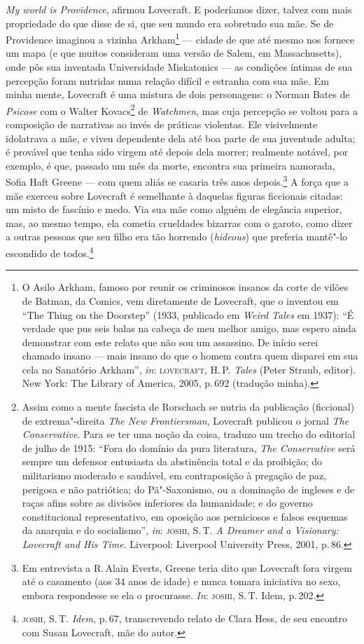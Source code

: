 \emph{My world is Providence}, afirmou Lovecraft. E poderíamos dizer,
talvez com mais propriedade do que disse de si, que seu mundo era
sobretudo sua mãe. Se de Providence imaginou a vizinha Arkham\footnote{O
  Asilo Arkham, famoso por reunir os criminosos insanos da corte de
  vilões de Batman, da  Comics, vem diretamente de Lovecraft, que o
  inventou em ``The Thing on the Doorstep'' (1933, publicado em
  \emph{Weird Tales} em 1937): ``É verdade que pus seis balas na cabeça
  de meu melhor amigo, mas espero ainda demonstrar com este relato que
  não sou um assassino. De início serei chamado insano --- mais insano
  do que o homem contra quem disparei em sua cela no Sanatório Arkham'',
  \emph{in}: \textsc{lovecraft}, H.\,P. \emph{Tales} (Peter Straub, editor). New
  York: The Library of America, 2005, p.\,692 (tradução minha).} ---
cidade de que até mesmo nos fornece um mapa (e que muitos consideram uma
versão de Salem, em Massachusetts), onde pôs sua inventada Universidade
Miskatonics --- as condições íntimas de sua percepção foram nutridas
numa relação difícil e estranha com sua mãe. Em minha mente, Lovecraft é
uma mistura de dois personagens: o Norman Bates de \emph{Psicose} com o
Walter Kovacs\footnote{Assim como a mente fascista de Rorschach se
  nutria da publicação (ficcional) de extrema"-direita \emph{The New
  Frontiersman}, Lovecraft publicou o jornal \emph{The Conservative}.
  Para se ter uma noção da coisa, traduzo um trecho do editorial de
  julho de 1915: ``Fora do domínio da pura literatura, \emph{The
  Conservative} será sempre um defensor entusiasta da abstinência total
  e da proibição; do militarismo moderado e saudável, em contraposição à
  pregação de paz, perigosa e não patriótica; do Pã"-Saxonismo, ou a
  dominação de ingleses e de raças afins sobre as divisões inferiores da
  humanidade; e do governo constitucional representativo, em oposição
  aos perniciosos e falsos esquemas da anarquia e do socialismo'',
  \emph{in}: \textsc{joshi}, S.\,T. \emph{A Dreamer and a Visionary: Lovecraft and
  His Time}. Liverpool: Liverpool University Press, 2001, p.\,86.} de
\emph{Watchmen}, mas cuja percepção se voltou para a composição de
narrativas ao invés de práticas violentas. Ele visivelmente idolatrava a
mãe, e viveu dependente dela até boa parte de sua juventude adulta; é
provável que tenha sido virgem até depois dela morrer; realmente
notável, por exemplo, é que, passado um mês da morte, encontra sua
primeira namorada, Sofia Haft Greene --- com quem aliás se casaria três
anos depois.\footnote{Em entrevista a R.\,Alain Everts, Greene teria dito
  que Lovecraft fora virgem até o casamento (aos 34 anos de idade) e
  nunca tomara iniciativa no sexo, embora respondesse se ela o
  procurasse. \emph{In}: \textsc{joshi}, S.\,T. Idem, p.\,202.} A força que a mãe
exerceu sobre Lovecraft é semelhante à daquelas figuras ficcionais
citadas: um misto de fascínio e medo. Via sua mãe como alguém de
elegância superior, mas, ao mesmo tempo, ela cometia crueldades bizarras
com o garoto, como dizer a outras pessoas que seu filho era tão horrendo
(\emph{hideous}) que preferia mantê"-lo escondido de todos.\footnote{\textsc{joshi}, S.\,T. \emph{Idem}, p.\,67, transcrevendo relato de Clara Hess, de seu
  encontro com Susan Lovecraft, mãe do autor.}


